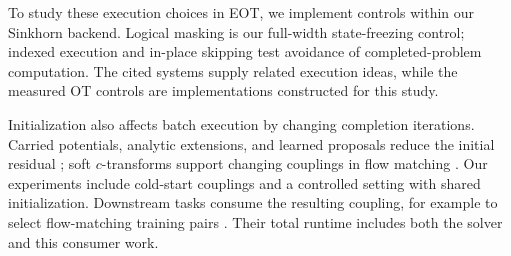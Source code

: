 To study these execution choices in EOT, we implement controls within our Sinkhorn backend. Logical masking is our full-width state-freezing control; indexed execution and in-place skipping test avoidance of completed-problem computation. The cited systems supply related execution ideas, while the measured OT controls are implementations constructed for this study.

Initialization also affects batch execution by changing completion iterations. Carried potentials, analytic extensions, and learned proposals reduce the initial residual \citep{amos2023meta,thornton2023initialization}; soft $c$-transforms support changing couplings in flow matching \citep{zhang2025large}. Our experiments include cold-start couplings and a controlled setting with shared initialization. Downstream tasks consume the resulting coupling, for example to select flow-matching training pairs \citep{pooladian2023multisample}. Their total runtime includes both the solver and this consumer work.
